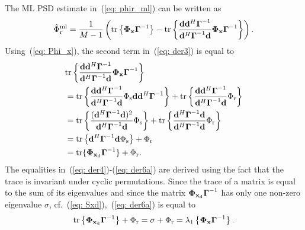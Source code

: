 \documentclass[10pt]{IEEEtran}
\begin{document}
The ML PSD estimate in~(\ref{eq: phir_ml}) can be written as
\begin{equation}
\label{eq: der3}
\hat{\Phi}_{\rm r}^{\rm ml} = \frac{1}{M-1} \left({\rm tr}\left\{ \mathbf{\Phi}_{\mathbf{x}}\boldsymbol{\Gamma}^{-1} \right\} -{\rm tr} \left\{ \frac{\mathbf{d} \mathbf{d}^H \boldsymbol{\Gamma}^{-1} } {\mathbf{d}^H\boldsymbol{\Gamma}^{-1}\mathbf{d}} \mathbf{\Phi}_{\mathbf{x}}\boldsymbol{\Gamma}^{-1}\right\} \right).
\end{equation}
Using~(\ref{eq: Phi_x}), the second term in~(\ref{eq: der3}) is equal to
\begin{align}
& {\rm tr} \left\{\frac{\mathbf{d} \mathbf{d}^H \boldsymbol{\Gamma}^{-1} } {\mathbf{d}^H\boldsymbol{\Gamma}^{-1}\mathbf{d}} \mathbf{\Phi}_{\mathbf{x}}\boldsymbol{\Gamma}^{-1}\right\}  \\
\label{eq: equiv}
&  = {\rm tr} \left\{\frac{\mathbf{d} \mathbf{d}^H \boldsymbol{\Gamma}^{-1} } {\mathbf{d}^H\boldsymbol{\Gamma}^{-1}\mathbf{d}} \Phi_{\rm s}\mathbf{d}\mathbf{d}^H  \boldsymbol{\Gamma}^{-1}\right\} + {\rm tr} \left\{\frac{\mathbf{d} \mathbf{d}^H \boldsymbol{\Gamma}^{-1} } {\mathbf{d}^H\boldsymbol{\Gamma}^{-1}\mathbf{d}} \Phi_{\rm r} \right\} \\
\label{eq: der4}
& = {\rm tr} \left\{\frac{( \mathbf{d}^H \boldsymbol{\Gamma}^{-1}\mathbf{d})^2 } {\mathbf{d}^H\boldsymbol{\Gamma}^{-1}\mathbf{d}} \Phi_{\rm s}\right\} + {\rm tr} \left\{\frac{\mathbf{d}^H \boldsymbol{\Gamma}^{-1}\mathbf{d} } {\mathbf{d}^H\boldsymbol{\Gamma}^{-1}\mathbf{d}} \Phi_{\rm r}\right\} \\
\label{eq: der5a}
& = {\rm tr} \left\{\mathbf{d}^H \boldsymbol{\Gamma}^{-1}\mathbf{d}\Phi_{\rm s} \right \} +  \Phi_{\rm r} \\
\label{eq: der6a}
&  ={\rm tr} \{ \mathbf{\Phi}_{\mathbf{x}_{\rm d}}\boldsymbol{\Gamma}^{-1} \} +  \Phi_{\rm r}.
\end{align}
The equalities in~(\ref{eq: der4})-(\ref{eq: der6a}) are derived using the fact that the trace is invariant under cyclic permutations.
Since the trace of a matrix is equal to the sum of its eigenvalues and since the matrix $\mathbf{\Phi}_{\mathbf{x}_{\rm d}}\boldsymbol{\Gamma}^{-1}$ has only one non-zero eigenvalue $\sigma$, cf.~(\ref{eq: Sxd}),~(\ref{eq: der6a}) is equal to
\begin{equation}
\label{eq: final_der}
{\rm tr} \left\{ \mathbf{\Phi}_{\mathbf{x}_{\rm d}}\boldsymbol{\Gamma}^{-1} \right \} + \Phi_{\rm r} = \sigma + \Phi_{\rm r} = \lambda_1 \left\{ \mathbf{\Phi}_{\mathbf{x}}\boldsymbol{\Gamma}^{-1}\right\}.
\end{equation}
\end{document}
